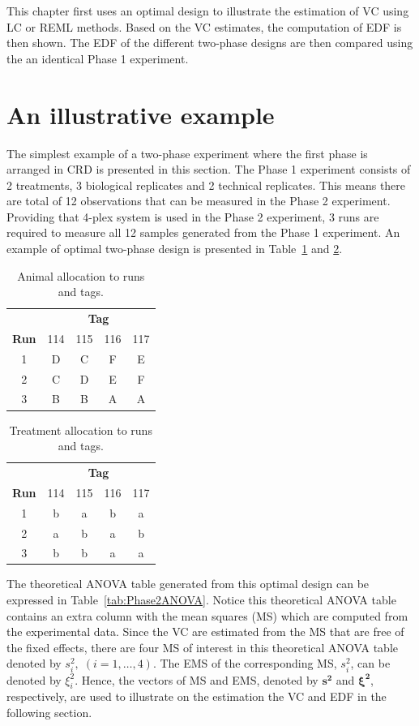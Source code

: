 \documentclass[12pt,a4paper]{article}
\begin{document}
This chapter first uses an optimal design to illustrate the estimation of VC using LC or REML methods. Based on the VC estimates, the computation of EDF is then shown. The EDF of the different two-phase designs are then compared using the an identical Phase 1 experiment. 

\section{An illustrative example}
\label{sec:expDes}
The simplest example of a two-phase experiment where the first phase is arranged in CRD is presented in this section. The Phase 1 experiment consists of 2 treatments, 3 biological replicates and 2 technical replicates. This means there are total of 12 observations that can be measured in the Phase 2 experiment. Providing that 4-plex system is used in the Phase 2 experiment, 3 runs are required to measure all 12 samples generated from the Phase 1 experiment. An example of optimal two-phase design is presented in Table~\ref{tab:aniDes1} and \ref{tab:trtDes1}.

\begin{table}[ht]
\centering
\caption{Animal allocation to runs and tags.}
\begin{tabular}{c|cccc}
 & \multicolumn{4}{c}{{\bf Tag}} \\
{\bf Run}  & 114 & 115 & 116 & 117 \\ 
\hline 
1 & D & C & F & E \\  
2 & C & D & E & F \\  
3 & B & B & A & A \\ 
\end{tabular} 
\label{tab:aniDes1}
\end{table}

\begin{table}[ht]
\centering
\caption{Treatment allocation to runs and tags.}
\begin{tabular}{c|cccc}
 & \multicolumn{4}{c}{{\bf Tag}} \\
{\bf Run}  & 114 & 115 & 116 & 117 \\ 
\hline 
1 & b & a & b & a \\  
2 & a & b & a & b \\  
3 & b & b & a & a \\  
\end{tabular} 
\label{tab:trtDes1}
\end{table}

The theoretical ANOVA table generated from this optimal design can be expressed in Table~\ref{tab:Phase2ANOVA}. Notice this theoretical ANOVA table contains an extra column with the mean squares (MS) which are computed from the experimental data. Since the VC are estimated from the MS that are free of the fixed effects, there are four MS of interest in this theoretical ANOVA table denoted by $s_i^2, \; (i = 1,\dots, 4).$ The EMS of the corresponding MS, $s_i^2$, can be denoted by $\xi_i^2$. Hence, the vectors of MS and EMS, denoted by $\bm{s^2}$ and $\bm{\xi^2}$, respectively, are used to illustrate on the estimation the VC and EDF in the following section.
\end{document}

